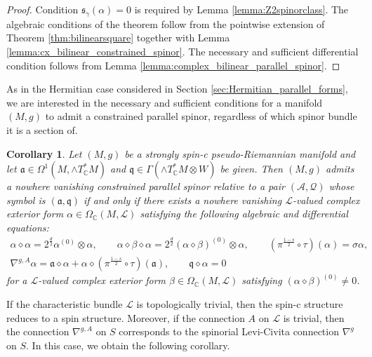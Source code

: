 \documentclass[10pt,a4paper,twoside,reqno]{amsart}
\theoremstyle{plain}
\newtheorem{cor}[thm]{Corollary}
\theoremstyle{definition}
\theoremstyle{remark}
\def\C{\mathbb{C}}
\def\cQ{\mathcal{Q}}
\def\fra{\mathfrak{a}}
\def\frq{\mathfrak{q}}
\def\cA{\mathcal{A}}
\def\cL{\mathcal{L}}
\begin{document}
\begin{proof}
Condition $\mathfrak{s}_{\gamma}(\alpha)=0$ is required by Lemma \ref{lemma:Z2spinorclass}. The algebraic conditions of the theorem follow from the pointwise extension of Theorem \ref{thm:bilinearsquare} together with Lemma \ref{lemma:cx_bilinear_constrained_spinor}. The necessary and sufficient differential condition follows from Lemma \ref{lemma:complex_bilinear_parallel_spinor}. 
\end{proof}

As in the Hermitian case considered in Section \ref{sec:Hermitian_parallel_forms}, we are interested in the necessary and sufficient conditions for a manifold $(M,g)$ to admit a constrained parallel spinor, regardless of which spinor bundle it is a section of. 

\begin{cor}
\label{cor:even_constrained_parallel_spinorsbilinear}
Let $(M,g)$ be a strongly spin-c pseudo-Riemannian manifold and let $\fra\in\Omega^1(M,\wedge T^*_\C M)$ and $\frq\in\Gamma(\wedge T^*_\C M\otimes W)$ be given. Then $(M,g)$ admits a nowhere vanishing constrained parallel spinor relative to a pair $(\cA,\cQ)$ whose symbol is $(\fra,\frq)$ if and only if there exists a nowhere vanishing $\cL$-valued complex exterior form $\alpha\in\Omega_\C(M,\cL)$ satisfying the following algebraic and differential equations: 
\begin{gather*}
    \alpha\diamond\alpha=2^{\frac{d}{2}}\alpha^{(0)}\otimes\alpha,\qquad \alpha\diamond\beta\diamond\alpha=2^{\frac{d}{2}}(\alpha\diamond\beta)^{(0)}\otimes\alpha,\qquad (\pi^{\frac{1-s}{2}}\circ\tau)(\alpha)=\sigma\alpha,\\
    \nabla^{g,A}\alpha=\fra\diamond\alpha+\alpha\diamond(\pi^{\frac{1-s}{2}}\circ\tau)(\fra),\qquad \frq\diamond\alpha=0
\end{gather*} 
for a $\cL$-valued complex exterior form $\beta\in\Omega_\C(M,\cL)$ satisfying $(\alpha\diamond\beta)^{(0)}\neq0$.
\end{cor}

If the characteristic bundle $\cL$ is topologically trivial, then the spin-c structure reduces to a spin structure. Moreover, if the connection $A$ on $\cL$ is trivial, then the connection $\nabla^{g,A}$ on $S$ corresponds to the spinorial Levi-Civita connection $\nabla^g$ on $S$. In this case, we obtain the following corollary.
\end{document}
